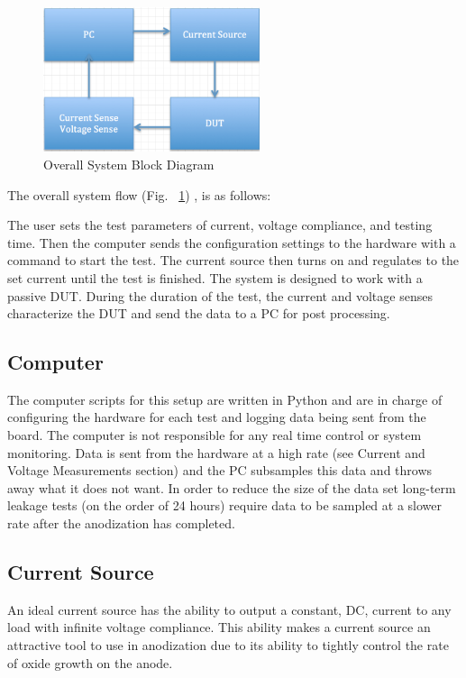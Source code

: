 \documentclass[journal]{IEEEtran}
\begin{document}
\begin{figure}[here]
\centering
\includegraphics[width=2.5in]{blockDiagram}
\caption{Overall System Block Diagram}
\label{fig:blockDiagram}
\end{figure}

The overall system flow (Fig. ~\ref{fig:blockDiagram}) , is as follows:

The user sets the test parameters of current, voltage compliance, and testing time. Then the computer sends the configuration settings to the hardware with a command to start the test. The current source then turns on and regulates to the set current until the test is finished. The system is designed to work with a passive DUT. During the duration of the test, the current and voltage senses characterize the DUT and send the data to a PC for post processing.

\subsection{Computer}

The computer scripts for this setup are written in Python and are in charge of configuring the hardware for each test and logging data being sent from the board. The computer is not responsible for any real time control or system monitoring. Data is sent from the hardware at a high rate (see Current and Voltage Measurements section) and the PC subsamples this data and throws away what it does not want. In order to reduce the size of the data set long-term leakage tests (on the order of 24 hours) require data to be sampled at a slower rate after the anodization has completed.


\subsection{Current Source}

An ideal current source has the ability to output a constant, DC, current to any load with infinite voltage compliance. This ability makes a current source an attractive tool to use in anodization due to its ability to tightly control the rate of oxide growth on the anode.
\end{document}

